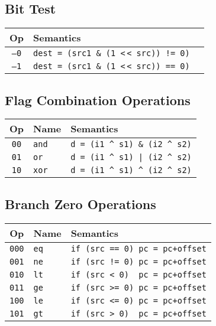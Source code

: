 \documentclass[10pt,DIV12]{scrartcl}
\newcommand{\shl}{\textless$\,\!$\textless}
\begin{document}
\subsection{Bit Test}
\label{sec:btest}

\begin{tabular}{cll}
\toprule
Op & Semantics \\
\midrule
\texttt{---0} & \texttt{dest = (src1 \& (1 \shl{} src)) != 0)} \\
\texttt{---1} & \texttt{dest = (src1 \& (1 \shl{} src)) == 0)} \\
\bottomrule  
\end{tabular}

\subsection{Flag Combination Operations}
\label{sec:comb}

\begin{tabular}{cll}
\toprule
Op & Name & Semantics \\
\midrule
\texttt{00} & \texttt{and} & \texttt{d = (i1 \textasciicircum{} s1) \& (i2 \textasciicircum{} s2)} \\
\texttt{01} & \texttt{or} & \texttt{d = (i1 \textasciicircum{} s1) | (i2 \textasciicircum{} s2)} \\
\texttt{10} & \texttt{xor} & \texttt{d = (i1 \textasciicircum{} s1) \textasciicircum{} (i2 \textasciicircum{} s2)} \\
\bottomrule  
\end{tabular}

\subsection{Branch Zero Operations}
\label{sec:brz}

\begin{tabular}{cll}
\toprule
Op & Name & Semantics \\
\midrule
\texttt{000} & \texttt{eq} & \texttt{if (src == 0) pc = pc+offset} \\
\texttt{001} & \texttt{ne} & \texttt{if (src != 0) pc = pc+offset} \\
\texttt{010} & \texttt{lt} & \texttt{if (src < 0) \ pc = pc+offset} \\
\texttt{011} & \texttt{ge} & \texttt{if (src >= 0) pc = pc+offset} \\
\texttt{100} & \texttt{le} & \texttt{if (src <= 0) pc = pc+offset} \\
\texttt{101} & \texttt{gt} & \texttt{if (src > 0) \ pc = pc+offset} \\
\bottomrule  
\end{tabular}
\end{document}
